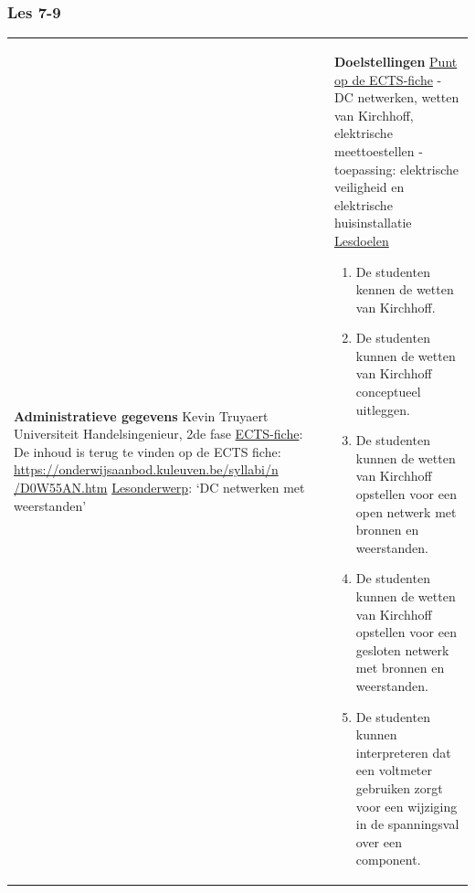 


\begin{landscape}
	
	\subsubsection{Les 7-9}
	\begin{tabularx}{1.56\textwidth}{|p{}|X|}\hline
		\textbf{Administratieve gegevens}\newline\newline
		Kevin Truyaert\newline\newline
		Universiteit\newline
		Handelsingenieur, 2de fase\newline
		\underline{ECTS-fiche}: De inhoud is terug te vinden op de ECTS fiche: \href{https://onderwijsaanbod.kuleuven.be/syllabi/n/D0W55AN.htm}{https://onderwijsaanbod.kuleuven.be/syllabi/n /D0W55AN.htm} \newline
		\underline{Lesonderwerp}: `DC netwerken met weerstanden' & \textbf{Doelstellingen}\newline\vspace{0.5cm}
		\underline{Punt op de ECTS-fiche}
		\vspace{-0.5cm}\newline  - DC netwerken, wetten van Kirchhoff, elektrische meettoestellen \newline - toepassing: elektrische veiligheid en elektrische huisinstallatie \newline
		\underline{Lesdoelen}\newline
		\vspace{-0.5cm}
		\begin{enumerate}[itemsep=0.08\baselineskip]
			\item De studenten kennen de wetten van Kirchhoff.
			\item De studenten kunnen de wetten van Kirchhoff conceptueel uitleggen.
			\item De studenten kunnen de wetten van Kirchhoff opstellen voor een open netwerk met bronnen en weerstanden.
			\item De studenten kunnen de wetten van Kirchhoff opstellen voor een gesloten netwerk met bronnen en weerstanden.
			\item De studenten kunnen interpreteren dat een voltmeter gebruiken zorgt voor een wijziging in de spanningsval over een component. 

\end{enumerate}
\end{tabularx}
\end{landscape}
